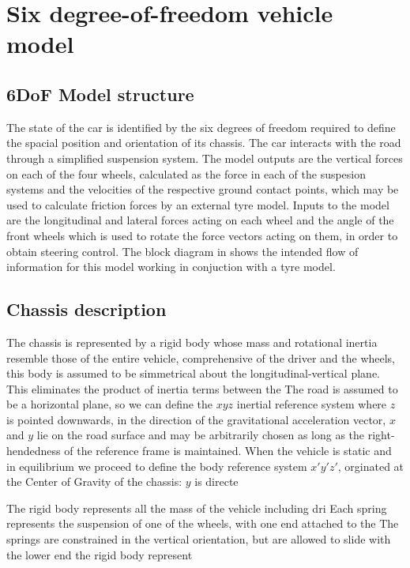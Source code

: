 \chapter{Six degree-of-freedom vehicle model}
\label{chap:6dof}
\section{6DoF Model structure}
\label{sec:6dofconcept}
The state of the car is identified by the six degrees of freedom required to define the spacial position and orientation of its chassis. The car interacts with the road through a simplified suspension system.
The model outputs are the vertical forces on each of the four wheels, calculated as the force in each of the suspesion systems and the velocities of the respective ground contact points, which may be used to calculate friction forces by an external tyre model.
Inputs to the model are the longitudinal and lateral forces acting on each wheel and the angle of the front wheels which is used to rotate the force vectors acting on them, in order to obtain steering control.
The block diagram in  shows the intended flow of information for this model working in conjuction with a tyre model.
\section{Chassis description}
\label{sec:body}
The chassis is represented by a rigid body whose mass and rotational inertia resemble those of the entire vehicle, comprehensive of the driver and the wheels, this body is assumed to be simmetrical about the longitudinal-vertical plane. This eliminates the product of inertia terms between the
The road is assumed to be a horizontal plane, so we can define the $xyz$ inertial reference system where $z$ is pointed downwards, in the direction of the gravitational acceleration vector, $x$ and $y$ lie on the road surface and may be arbitrarily chosen as long as the right-hendedness of the reference frame is maintained.
When the vehicle is static and in equilibrium we proceed to define the body reference system $x'y'z'$, orginated at the Center of Gravity of the chassis: $y$ is directe

The rigid body represents all the mass of the vehicle including dri
Each spring represents the suspension of one of the wheels, with one end attached to the
The springs are constrained in the vertical orientation, but are allowed to slide with the lower end
the rigid body represent
